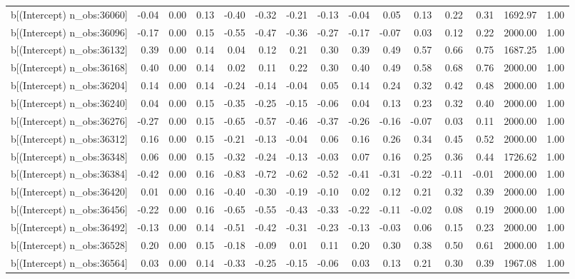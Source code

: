 \begin{table}[ht]
\begin{tabular}{rrrrrrrrrrrrrrr}
  b[(Intercept) n\_obs:36060] & -0.04 & 0.00 & 0.13 & -0.40 & -0.32 & -0.21 & -0.13 & -0.04 & 0.05 & 0.13 & 0.22 & 0.31 & 1692.97 & 1.00 \\ 
  b[(Intercept) n\_obs:36096] & -0.17 & 0.00 & 0.15 & -0.55 & -0.47 & -0.36 & -0.27 & -0.17 & -0.07 & 0.03 & 0.12 & 0.22 & 2000.00 & 1.00 \\ 
  b[(Intercept) n\_obs:36132] & 0.39 & 0.00 & 0.14 & 0.04 & 0.12 & 0.21 & 0.30 & 0.39 & 0.49 & 0.57 & 0.66 & 0.75 & 1687.25 & 1.00 \\ 
  b[(Intercept) n\_obs:36168] & 0.40 & 0.00 & 0.14 & 0.02 & 0.11 & 0.22 & 0.30 & 0.40 & 0.49 & 0.58 & 0.68 & 0.76 & 2000.00 & 1.00 \\ 
  b[(Intercept) n\_obs:36204] & 0.14 & 0.00 & 0.14 & -0.24 & -0.14 & -0.04 & 0.05 & 0.14 & 0.24 & 0.32 & 0.42 & 0.48 & 2000.00 & 1.00 \\ 
  b[(Intercept) n\_obs:36240] & 0.04 & 0.00 & 0.15 & -0.35 & -0.25 & -0.15 & -0.06 & 0.04 & 0.13 & 0.23 & 0.32 & 0.40 & 2000.00 & 1.00 \\ 
  b[(Intercept) n\_obs:36276] & -0.27 & 0.00 & 0.15 & -0.65 & -0.57 & -0.46 & -0.37 & -0.26 & -0.16 & -0.07 & 0.03 & 0.11 & 2000.00 & 1.00 \\ 
  b[(Intercept) n\_obs:36312] & 0.16 & 0.00 & 0.15 & -0.21 & -0.13 & -0.04 & 0.06 & 0.16 & 0.26 & 0.34 & 0.45 & 0.52 & 2000.00 & 1.00 \\ 
  b[(Intercept) n\_obs:36348] & 0.06 & 0.00 & 0.15 & -0.32 & -0.24 & -0.13 & -0.03 & 0.07 & 0.16 & 0.25 & 0.36 & 0.44 & 1726.62 & 1.00 \\ 
  b[(Intercept) n\_obs:36384] & -0.42 & 0.00 & 0.16 & -0.83 & -0.72 & -0.62 & -0.52 & -0.41 & -0.31 & -0.22 & -0.11 & -0.01 & 2000.00 & 1.00 \\ 
  b[(Intercept) n\_obs:36420] & 0.01 & 0.00 & 0.16 & -0.40 & -0.30 & -0.19 & -0.10 & 0.02 & 0.12 & 0.21 & 0.32 & 0.39 & 2000.00 & 1.00 \\ 
  b[(Intercept) n\_obs:36456] & -0.22 & 0.00 & 0.16 & -0.65 & -0.55 & -0.43 & -0.33 & -0.22 & -0.11 & -0.02 & 0.08 & 0.19 & 2000.00 & 1.00 \\ 
  b[(Intercept) n\_obs:36492] & -0.13 & 0.00 & 0.14 & -0.51 & -0.42 & -0.31 & -0.23 & -0.13 & -0.03 & 0.06 & 0.15 & 0.23 & 2000.00 & 1.00 \\ 
  b[(Intercept) n\_obs:36528] & 0.20 & 0.00 & 0.15 & -0.18 & -0.09 & 0.01 & 0.11 & 0.20 & 0.30 & 0.38 & 0.50 & 0.61 & 2000.00 & 1.00 \\ 
  b[(Intercept) n\_obs:36564] & 0.03 & 0.00 & 0.14 & -0.33 & -0.25 & -0.15 & -0.06 & 0.03 & 0.13 & 0.21 & 0.30 & 0.39 & 1967.08 & 1.00 \\ 

\end{tabular}
\end{table}
